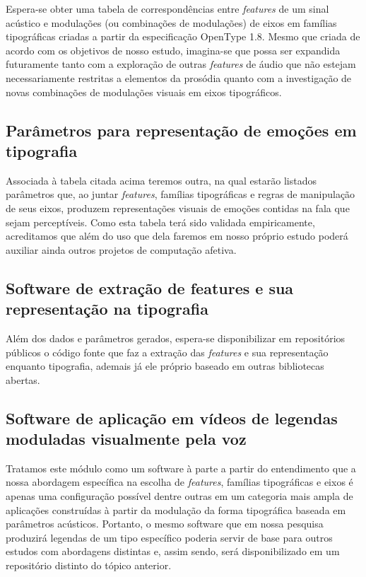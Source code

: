 \documentclass[a4paper,11pt,titlepage,singlespacing]{article}
\begin{document}
    Espera-se obter uma tabela de correspondências entre \textit{features} de um sinal acústico e modulações (ou combinações de modulações) de eixos em famílias tipográficas criadas a partir da especificação OpenType 1.8. Mesmo que criada de acordo com os objetivos de nosso estudo, imagina-se que possa ser expandida futuramente tanto com a exploração de outras \textit{features} de áudio que não estejam necessariamente restritas a elementos da prosódia quanto com a investigação de novas combinações de modulações visuais em eixos tipográficos. 
    
    \subsection{Parâmetros para representação de emoções em tipografia}
    
    Associada à tabela citada acima teremos outra, na qual estarão listados parâmetros que, ao juntar \textit{features}, famílias tipográficas e regras de manipulação de seus eixos, produzem representações visuais de emoções contidas na fala que sejam perceptíveis. Como esta tabela terá sido validada empiricamente, acreditamos que além do uso que dela faremos em nosso próprio estudo poderá auxiliar ainda outros projetos de computação afetiva.
    
    \subsection{Software de extração de features e sua representação na tipografia}
    
    Além dos dados e parâmetros gerados, espera-se disponibilizar em repositórios públicos o código fonte que faz a extração das \textit{features} e sua representação enquanto tipografia, ademais já ele próprio baseado em outras bibliotecas abertas.
    
    \subsection{Software de aplicação em vídeos de legendas moduladas visualmente pela voz}
    
    Tratamos este módulo como um software à parte a partir do entendimento que a nossa abordagem específica na escolha de \textit{features}, famílias tipográficas e eixos é apenas uma configuração possível dentre outras em um categoria mais ampla de aplicações construídas à partir da modulação da forma tipográfica baseada em parâmetros acústicos. Portanto, o mesmo software que em nossa pesquisa produzirá legendas de um tipo específico poderia servir de base para outros estudos com abordagens distintas e, assim sendo, será disponibilizado em um repositório distinto do tópico anterior.
    
\end{document}
